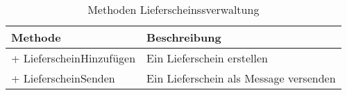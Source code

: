 \begin{table}[ht!]
\centering
\caption{Methoden Lieferscheinssverwaltung}
\label{tab:MethodenLieferscheinssverwaltung}
\begin{tabularx}{\linewidth}{@{}lX@{}}
\toprule
Methode                 & Beschreibung              \\ \midrule
+ LieferscheinHinzufügen    & Ein Lieferschein erstellen \\
+ LieferscheinSenden        & Ein Lieferschein als Message versenden \\ \bottomrule
\end{tabularx}
\end{table}
